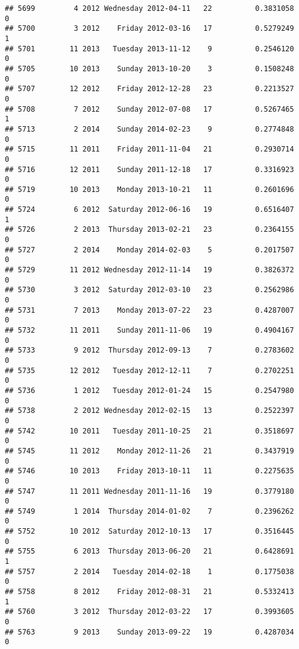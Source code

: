 \documentclass[
]{article}
\begin{document}
\begin{verbatim}
## 5699         4 2012 Wednesday 2012-04-11   22          0.3831058             0
## 5700         3 2012    Friday 2012-03-16   17          0.5279249             1
## 5701        11 2013   Tuesday 2013-11-12    9          0.2546120             0
## 5705        10 2013    Sunday 2013-10-20    3          0.1508248             0
## 5707        12 2012    Friday 2012-12-28   23          0.2213527             0
## 5708         7 2012    Sunday 2012-07-08   17          0.5267465             1
## 5713         2 2014    Sunday 2014-02-23    9          0.2774848             0
## 5715        11 2011    Friday 2011-11-04   21          0.2930714             0
## 5716        12 2011    Sunday 2011-12-18   17          0.3316923             0
## 5719        10 2013    Monday 2013-10-21   11          0.2601696             0
## 5724         6 2012  Saturday 2012-06-16   19          0.6516407             1
## 5726         2 2013  Thursday 2013-02-21   23          0.2364155             0
## 5727         2 2014    Monday 2014-02-03    5          0.2017507             0
## 5729        11 2012 Wednesday 2012-11-14   19          0.3826372             0
## 5730         3 2012  Saturday 2012-03-10   23          0.2562986             0
## 5731         7 2013    Monday 2013-07-22   23          0.4287007             0
## 5732        11 2011    Sunday 2011-11-06   19          0.4904167             0
## 5733         9 2012  Thursday 2012-09-13    7          0.2783602             0
## 5735        12 2012   Tuesday 2012-12-11    7          0.2702251             0
## 5736         1 2012   Tuesday 2012-01-24   15          0.2547980             0
## 5738         2 2012 Wednesday 2012-02-15   13          0.2522397             0
## 5742        10 2011   Tuesday 2011-10-25   21          0.3518697             0
## 5745        11 2012    Monday 2012-11-26   21          0.3437919             0
## 5746        10 2013    Friday 2013-10-11   11          0.2275635             0
## 5747        11 2011 Wednesday 2011-11-16   19          0.3779180             0
## 5749         1 2014  Thursday 2014-01-02    7          0.2396262             0
## 5752        10 2012  Saturday 2012-10-13   17          0.3516445             0
## 5755         6 2013  Thursday 2013-06-20   21          0.6428691             1
## 5757         2 2014   Tuesday 2014-02-18    1          0.1775038             0
## 5758         8 2012    Friday 2012-08-31   21          0.5332413             1
## 5760         3 2012  Thursday 2012-03-22   17          0.3993605             0
## 5763         9 2013    Sunday 2013-09-22   19          0.4287034             0

\end{verbatim}
\end{document}
